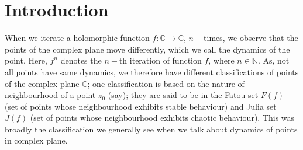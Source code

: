 \documentclass[a4paper,12pt]{amsart}
\numberwithin{equation}{section}
\begin{document}
\section{Introduction}
When we iterate a holomorphic function $ f:\mathbb{C}  \rightarrow \mathbb{C} $, %
$n-$times, we observe that the points of the complex plane move differently, which we call the dynamics of the point. Here,  $f^n$  denotes the $n-$th iteration of  function  $f$, where $n \in \mathbb{N}$. As, not all  points have same dynamics, we therefore have different classifications of points of the complex plane $\mathbb{C}$; one classification is based on the nature of neighbourhood of a point $z_0$ (say); they are said to be in the Fatou set $F(f)$  (set of points whose neighbourhood  exhibits stable behaviour) and Julia set $J(f)$ (set of points whose neighbourhood exhibits chaotic behaviour). This was  broadly the classification we generally see when we talk about dynamics of points in complex plane. 
\end{document}
